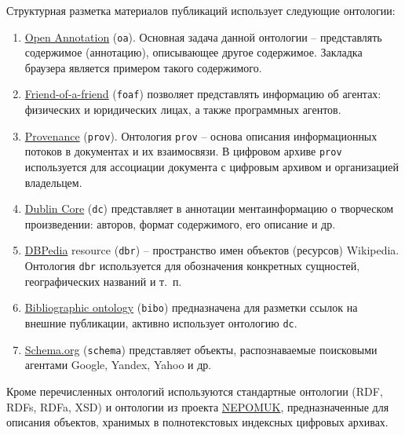 \documentclass[a4paper,12pt,openany,final]{extreport}
\begin{document}
Структурная разметка материалов публикаций использует следующие онтологии:
\begin{enumerate}
\item \href{http://www.openannotation.org/}{{Open Annotation}} (\texttt{oa}).  Основная задача данной онтологии -- представлять содержимое (аннотацию), описывающее другое содержимое. Закладка браузера является примером такого содержимого.
\item \href{http://xmlns.com/foaf/spec/}{{Friend-of-a-friend}} (\texttt{foaf}) позволяет представлять информацию об агентах: физических и юридических лицах, а также программных агентов.
\item \href{https://www.w3.org/TR/prov-o/}{{Provenance}} (\texttt{prov}). Онтология \texttt{prov} -- основа описания информационных потоков в документах и их взаимосвязи. В цифровом архиве \texttt{prov} используется для ассоциации документа с цифровым архивом и организацией владельцем.
\item \href{http://dublincore.org/documents/dcmi-terms/}{{Dublin Core}} (\texttt{dc}) представляет в аннотации ментаинформацию о творческом произведении: авторов, формат содержимого, его описание и др.
\item \href{http://wiki.dbpedia.org/}{{DBPedia}} resource (\texttt{dbr}) -- пространство имен объектов (ресурсов) Wikipedia. Онтология \texttt{dbr} используется для обозначения конкретных сущностей, географических названий и т.~п.
\item \href{http://bibliographic-ontology.org/specification}{{Bibliographic ontology}} (\texttt{bibo}) предназначена для разметки ссылок на внешние публикации, активно использует онтологию \texttt{dc}.
\item \href{http://schema.org/}{{Schema.org}} (\texttt{schema}) представляет объекты, распознаваемые поисковыми агентами Google, Yandex, Yahoo и др.
\end{enumerate}

Кроме перечисленных онтологий используются стандартные онтологии (RDF, RDFs, RDFa, XSD) и онтологии из проекта \href{https://userbase.kde.org/Nepomuk}{{NEPOMUK}}, предназначенные для описания объектов, хранимых в полнотекстовых индексных цифровых архивах.
\end{document}
